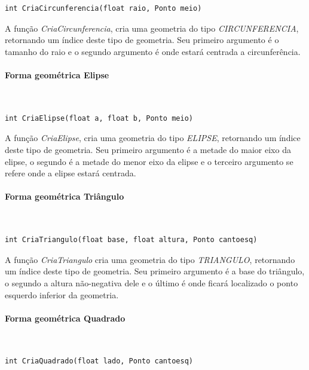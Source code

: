  
\begin{lstlisting}
int CriaCircunferencia(float raio, Ponto meio)
\end{lstlisting}


A função \emph{CriaCircunferencia}, cria uma geometria do tipo \emph{CIRCUNFERENCIA}, retornando um índice deste tipo de geometria. Seu primeiro argumento é o tamanho do raio e o segundo argumento é onde estará centrada a circunferência.

\paragraph{Forma geométrica Elipse}\mbox{}\\

 
\begin{lstlisting}
int CriaElipse(float a, float b, Ponto meio)
\end{lstlisting}


A função \emph{CriaElipse}, cria uma geometria do tipo \emph{ELIPSE}, retornando um índice deste tipo de geometria. Seu primeiro argumento é a metade do maior eixo da elipse, o segundo é a metade do menor eixo da elipse e o terceiro argumento se refere onde a elipse estará centrada.

\paragraph{Forma geométrica Triângulo}\mbox{}\\

 
\begin{lstlisting}
int CriaTriangulo(float base, float altura, Ponto cantoesq)
\end{lstlisting}


A função \emph{CriaTriangulo} cria uma geometria do tipo \emph{TRIANGULO}, retornando um índice deste tipo de geometria. Seu primeiro argumento é a base do triângulo, o segundo a altura não-negativa dele e o último é onde ficará localizado o ponto esquerdo inferior da geometria.

\paragraph{Forma geométrica Quadrado}\mbox{}\\

 
\begin{lstlisting}
int CriaQuadrado(float lado, Ponto cantoesq)
\end{lstlisting}


